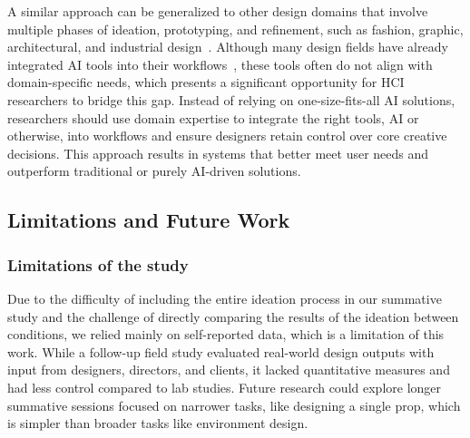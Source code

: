 A similar approach can be generalized to other design domains that involve multiple phases of ideation, prototyping, and refinement, such as fashion, graphic, architectural, and industrial design~\cite{camburn2017design, carlgren2016framing}. Although many design fields have already integrated AI tools into their workflows~\cite{anantrasirichai2022artificial}, these tools often do not align with domain-specific needs, which presents a significant opportunity for HCI researchers to bridge this gap.
Instead of relying on one-size-fits-all AI solutions, researchers should use domain expertise to integrate the right tools, AI or otherwise, into workflows and ensure designers retain control over core creative decisions. This approach results in systems that better meet user needs and outperform traditional or purely AI-driven solutions.


\subsection{Limitations and Future Work}
\subsubsection{Limitations of the study}
Due to the difficulty of including the entire ideation process in our summative study and the challenge of directly comparing the results of the ideation between conditions, we relied mainly on self-reported data, which is a limitation of this work. While a follow-up field study evaluated real-world design outputs with input from designers, directors, and clients, it lacked quantitative measures and had less control compared to lab studies. Future research could explore longer summative sessions focused on narrower tasks, like designing a single prop, which is simpler than broader tasks like environment design.

